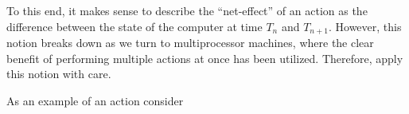 To this end, it makes sense to describe the ``net-effect'' of an action as the
difference between the state of the computer at time $T_n$ and $T_{n+1}$.
However, this notion breaks down as we turn to multiprocessor machines, where
the clear benefit of performing multiple actions at once has been utilized.
Therefore, apply this notion with care.



As an example of an action consider 
